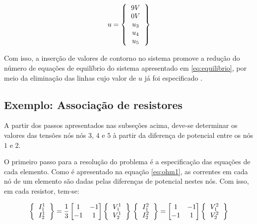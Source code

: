 \documentclass[
    12pt,               %
    openright,          %
    oneside,
    a4paper,            %
    english,            %
    french,             %
    spanish,            %
    brazil              %
    ]{abntex2}
\begin{document}
\begin{equation}
    \label{eq:condIni}
    u = 
        \left \{
        \begin{tabular}{c}
            $9V$ \\
            $0V$ \\
            $u_3$ \\
            $u_4$ \\
            $u_5$ \\
        \end{tabular}       
        \right \}   
\end{equation}

Com isso, a inserção de valores de contorno no sistema promove a redução do número de equações de equilíbrio do sistema apresentado em \ref{eq:equilibrio}, por meio da eliminação das linhas cujo valor de $u$ já foi especificado \cite[p. 5]{zien}.

\subsection{Exemplo: Associação de resistores}

A partir dos passos apresentados nas subseções acima, deve-se determinar os valores das tensões nós nós $3$, $4$ e $5$ à partir da diferença de potencial entre os nós $1$ e $2$.

O primeiro passo para a resolução do problema é a especificação das equações de cada elemento. Como é apresentado na equação \ref{eq:ohm1}, as correntes em cada nó de um elemento são dadas pelas diferenças de potencial nestes nós. Com isso, em cada resistor, tem-se:

 \begin{equation}
    \label{eq:ohmMalha}
	\left \{
     \begin{tabular}{c}
         $I_1^1$ \\
         $I_2^1$
     \end{tabular}       
     \right \} =
     	\frac{1}{3}
        \begin{bmatrix}
            1 & -1 \\
            -1 & 1
        \end{bmatrix}      
	\left \{
     \begin{tabular}{c}
         $V_1^1$ \\
         $V_2^1$
     \end{tabular}       
     \right \}  
	\\
	\left \{
     \begin{tabular}{c}
         $I_1^2$ \\
         $I_2^2$
     \end{tabular}       
     \right \} =
        \begin{bmatrix}
            1 & -1 \\
            -1 & 1
        \end{bmatrix}      
	\left \{
     \begin{tabular}{c}
         $V_1^2$ \\
         $V_2^2$
     \end{tabular}       
     \right \}               
 \end{equation}
\end{document}
